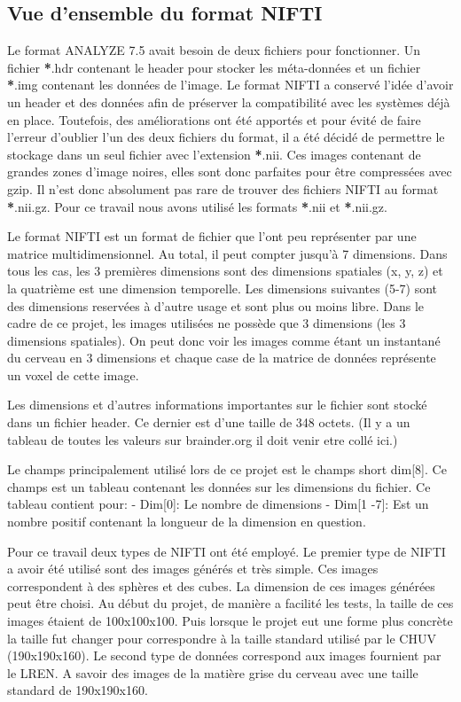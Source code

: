 \documentclass[a4paper,10pt,openany,oneside]{sphinxmanual}
\begin{document}
\subsection{Vue d'ensemble du format NIFTI}
\label{index:vue-d-ensemble-du-format-nifti}
Le format ANALYZE 7.5 avait besoin de deux fichiers pour fonctionner. Un fichier {\color{red}\bfseries{}*}.hdr contenant
le header pour stocker les méta-données et un fichier {\color{red}\bfseries{}*}.img contenant les données de l'image.
Le format NIFTI a conservé l'idée d'avoir un header et des données afin de préserver la compatibilité
avec les systèmes déjà en place. Toutefois, des améliorations ont été apportés et pour évité de faire
l'erreur d'oublier l'un des deux fichiers du format, il a été décidé de permettre le stockage
dans un seul fichier avec l'extension {\color{red}\bfseries{}*}.nii. Ces images contenant de grandes zones d'image
noires, elles sont donc parfaites pour être compressées avec gzip. Il n'est donc absolument
pas rare de trouver des fichiers NIFTI au format {\color{red}\bfseries{}*}.nii.gz. Pour ce travail nous avons utilisé
les formats {\color{red}\bfseries{}*}.nii et {\color{red}\bfseries{}*}.nii.gz.

Le format NIFTI est un format de fichier que l'ont peu représenter par une matrice multidimensionnel.
Au total, il peut compter jusqu'à 7 dimensions. Dans tous les cas, les 3 premières dimensions sont des
dimensions spatiales (x, y, z) et la quatrième est une dimension temporelle. Les dimensions suivantes
(5-7) sont des dimensions reservées à d'autre usage et sont plus ou moins libre. Dans le cadre de ce
projet, les images utilisées ne possède que 3 dimensions (les 3 dimensions spatiales). On peut donc voir
les images comme étant un instantané du cerveau en 3 dimensions et chaque case de la matrice de données
représente un voxel de cette image.

Les dimensions et d'autres informations importantes sur le fichier sont stocké dans un fichier
header. Ce dernier est d'une taille de 348 octets. (Il y a un tableau de toutes les valeurs sur
brainder.org il doit venir etre collé ici.)

Le champs principalement utilisé lors de ce projet est le champs short dim{[}8{]}. Ce champs est un
tableau contenant les données sur les dimensions du fichier. Ce tableau contient pour:
- Dim{[}0{]}: Le nombre de dimensions
- Dim{[}1 -7{]}: Est un nombre positif contenant la longueur de la dimension en question.

Pour ce travail deux types de NIFTI ont été employé. Le premier type de NIFTI a avoir été utilisé sont des
images générés et très simple. Ces images correspondent à des sphères et des cubes. La dimension de ces images
générées peut être choisi. Au début du projet, de manière a facilité les tests, la taille de ces images étaient
de 100x100x100. Puis lorsque le projet eut une forme plus concrète la taille fut changer pour correspondre à la
taille standard utilisé par le CHUV (190x190x160). Le second type de données correspond aux images fournient par
le LREN. A savoir des images de la matière grise du cerveau avec une taille standard de 190x190x160.
\end{document}
